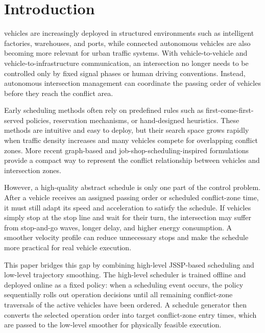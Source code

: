 \section{Introduction}
\label{sec:introduction}

 vehicles are increasingly deployed in structured environments such as intelligent factories, warehouses, and ports, while connected autonomous vehicles are also becoming more relevant for urban traffic systems. With vehicle-to-vehicle and vehicle-to-infrastructure communication, an intersection no longer needs to be controlled only by fixed signal phases or human driving conventions. Instead, autonomous intersection management can coordinate the passing order of vehicles before they reach the conflict area.

Early scheduling methods often rely on predefined rules such as first-come-first-served policies, reservation mechanisms, or hand-designed heuristics. These methods are intuitive and easy to deploy, but their search space grows rapidly when traffic density increases and many vehicles compete for overlapping conflict zones. More recent graph-based and job-shop-scheduling-inspired formulations provide a compact way to represent the conflict relationship between vehicles and intersection zones.

However, a high-quality abstract schedule is only one part of the control problem. After a vehicle receives an assigned passing order or scheduled conflict-zone time, it must still adapt its speed and acceleration to satisfy the schedule. If vehicles simply stop at the stop line and wait for their turn, the intersection may suffer from stop-and-go waves, longer delay, and higher energy consumption. A smoother velocity profile can reduce unnecessary stops and make the schedule more practical for real vehicle execution.

\begin{addedblock}
This paper bridges this gap by combining high-level JSSP-based scheduling and low-level trajectory smoothing. The high-level scheduler is trained offline and deployed online as a fixed policy: when a scheduling event occurs, the policy sequentially rolls out operation decisions until all remaining conflict-zone traversals of the active vehicles have been ordered. A schedule generator then converts the selected operation order into target conflict-zone entry times, which are passed to the low-level smoother for physically feasible execution.
\end{addedblock}

